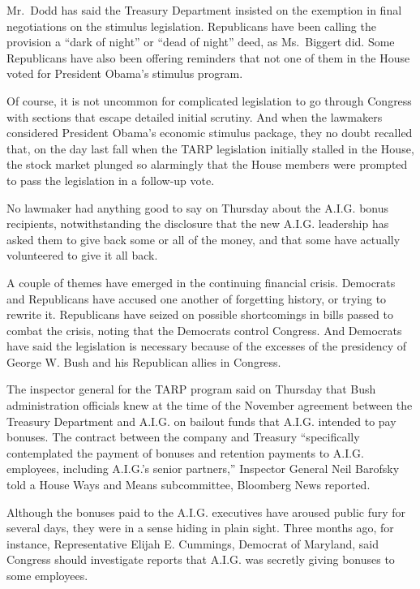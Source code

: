 \documentclass[12pt,a4paper,onecolumn]{article}
\begin{document}
\begin{CJK*}{GBK}{song}
Mr.~Dodd has said the Treasury Department insisted on the exemption in final negotiations on the
stimulus legislation. Republicans have been calling the provision a ``dark of night'' or ``dead of
night'' deed, as Ms.~Biggert did. Some Republicans have also been offering reminders that not one of
them in the House voted for President Obama's stimulus program.

Of course, it is not uncommon for complicated legislation to go through Congress with sections that
escape detailed initial scrutiny. And when the lawmakers considered President Obama's economic
stimulus package, they no doubt recalled that, on the day last fall when the TARP legislation
initially stalled in the House, the stock market plunged so alarmingly that the House members were
prompted to pass the legislation in a follow-up vote.

No lawmaker had anything good to say on Thursday about the A.I.G. bonus recipients, notwithstanding
the disclosure that the new A.I.G. leadership has asked them to give back some or all of the money,
and that some have actually volunteered to give it all back.

A couple of themes have emerged in the continuing financial crisis. Democrats and Republicans have
accused one another of forgetting history, or trying to rewrite it. Republicans have seized on
possible shortcomings in bills passed to combat the crisis, noting that the Democrats control
Congress. And Democrats have said the legislation is necessary because of the excesses of the
presidency of George W. Bush and his Republican allies in Congress.

The inspector general for the TARP program said on Thursday that Bush administration officials knew
at the time of the November agreement between the Treasury Department and A.I.G. on bailout funds
that A.I.G. intended to pay bonuses. The contract between the company and Treasury ``specifically
contemplated the payment of bonuses and retention payments to A.I.G. employees, including A.I.G.'s
senior partners,'' Inspector General Neil Barofsky told a House Ways and Means subcommittee,
Bloomberg News reported.

Although the bonuses paid to the A.I.G. executives have aroused public fury for several days, they
were in a sense hiding in plain sight. Three months ago, for instance, Representative Elijah E.
Cummings, Democrat of Maryland, said Congress should investigate reports that A.I.G. was secretly
giving bonuses to some employees.


\end{CJK*}
\end{document}
